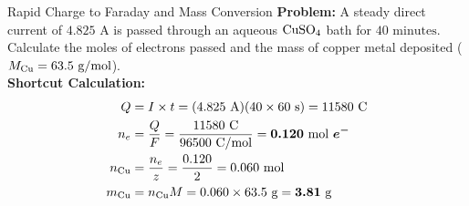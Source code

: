 \documentclass[11pt,a4paper]{report}
\newcommand{\ans}[1]{\ifmmode\bm{#1}\else\textbf{#1}\fi}
\begin{document}
\begin{microbox}{Rapid Charge to Faraday and Mass Conversion}
\textbf{Problem:} A steady direct current of $4.825\text{ A}$ is passed through an aqueous $\ce{CuSO4}$ bath for $40\text{ minutes}$. Calculate the moles of electrons passed and the mass of copper metal deposited ($M_{\ce{Cu}} = 63.5\text{ g/mol}$).\\
\textbf{Shortcut Calculation:}
\begin{align*}
Q &= I \times t = (4.825\text{ A})(40 \times 60\text{ s}) = 11580\text{ C} \\
n_e &= \frac{Q}{F} = \frac{11580\text{ C}}{96500\text{ C/mol}} = \ans{0.120\text{ mol } e^-} \\
n_{\ce{Cu}} &= \frac{n_e}{z} = \frac{0.120}{2} = 0.060\text{ mol} \\
m_{\ce{Cu}} &= n_{\ce{Cu}} M = 0.060 \times 63.5\text{ g} = \ans{3.81\text{ g}}
\end{align*}
\end{microbox}
\end{document}
